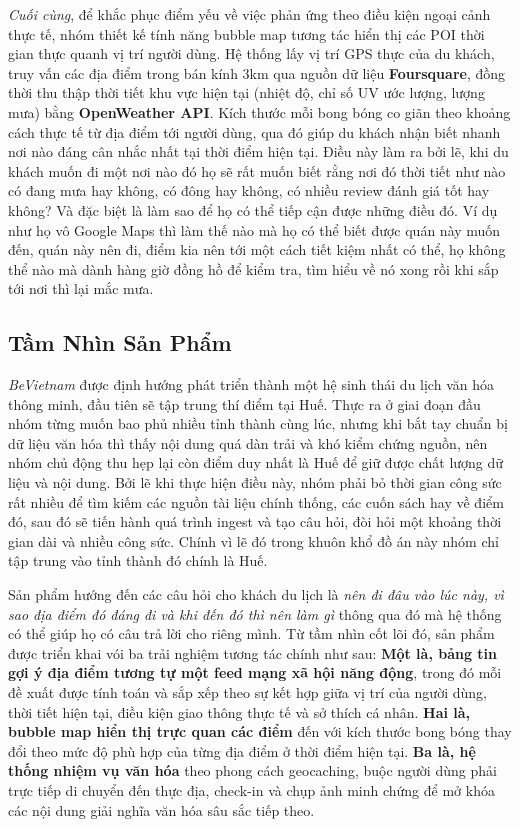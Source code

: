 \textit{Cuối cùng}, để khắc phục điểm yếu về việc phản ứng theo điều kiện ngoại
cảnh thực tế, nhóm thiết kế tính năng bubble map tương tác hiển thị các
POI thời gian thực quanh vị trí người dùng. Hệ thống lấy vị trí GPS
thực của du khách, truy vấn các địa điểm trong bán kính 3km qua nguồn
dữ liệu \textbf{Foursquare}, đồng thời thu thập thời tiết khu vực hiện tại (nhiệt
độ, chỉ số UV ước lượng, lượng mưa) bằng \textbf{OpenWeather API}. 
Kích thước mỗi bong bóng co giãn theo khoảng cách thực tế từ địa điểm tới người dùng, 
qua đó giúp du khách nhận biết nhanh nơi nào đáng cân nhắc nhất tại thời điểm hiện tại.
Điều này làm ra bởi lẽ, khi du khách muốn đi một nơi nào đó họ sẽ rất muốn biết rằng nơi đó thời tiết như nào có đang mưa
hay không, có đông hay không, có nhiều review đánh giá tốt hay không? Và đặc biệt là làm sao để họ có thể tiếp cận được những điều đó.
Ví dụ như họ vô Google Maps thì làm thế nào mà họ có thể biết được quán này muốn đến, quán này nên đi, điểm kia nên tới một cách tiết kiệm nhất có thể,
họ không thể nào mà dành hàng giờ đồng hồ để kiểm tra, tìm hiểu về nó xong rồi khi sắp tới nơi thì lại mắc mưa.

\subsection{Tầm Nhìn Sản Phẩm}
\contrib

\textit{BeVietnam} được định hướng phát triển thành một hệ sinh thái du lịch văn
hóa thông minh, đầu tiên sẽ tập trung thí điểm tại Huế. Thực ra ở giai
đoạn đầu nhóm từng muốn bao phủ nhiều tỉnh thành cùng lúc, nhưng khi bắt
tay chuẩn bị dữ liệu văn hóa thì thấy nội dung quá dàn trải và khó kiểm
chứng nguồn, nên nhóm chủ động thu hẹp lại còn điểm duy nhất là Huế để giữ
được chất lượng dữ liệu và nội dung. Bởi lẽ khi thực hiện điều này, nhóm phải
bỏ thời gian công sức rất nhiều để tìm kiếm các nguồn tài liệu chính thống, các cuốn sách hay
về điểm đó, sau đó sẽ tiến hành quá trình ingest và tạo câu hỏi, đòi hỏi một khoảng thời gian dài và
nhiều công sức. Chính vì lẽ đó trong khuôn khổ đồ án này nhóm chỉ tập trung vào tỉnh thành đó chính là Huế.

Sản phẩm hướng đến các câu hỏi cho khách du lịch là \textit{nên đi đâu vào lúc này, vì sao địa điểm đó
đáng đi và khi đến đó thì nên làm gì} thông qua đó mà hệ thống có thể giúp họ có câu trả lời cho riêng mình.
Từ tầm nhìn cốt lõi đó, sản phẩm được triển khai vói ba trải nghiệm
tương tác chính như sau: \textbf{Một là, bảng tin gợi ý địa điểm tương tự một feed
mạng xã hội năng động}, trong đó mỗi đề xuất được tính toán và sắp xếp
theo sự kết hợp giữa vị trí của người dùng, thời tiết hiện tại, điều
kiện giao thông thực tế và sở thích cá nhân. \textbf{Hai là, bubble map hiển
thị trực quan các điểm} đến với kích thước bong bóng thay đổi theo mức
độ phù hợp của từng địa điểm ở thời điểm hiện tại. \textbf{Ba là, hệ thống
nhiệm vụ văn hóa} theo phong cách geocaching, buộc người dùng phải trực
tiếp di chuyển đến thực địa, check-in và chụp ảnh minh chứng để mở khóa
các nội dung giải nghĩa văn hóa sâu sắc tiếp theo.

